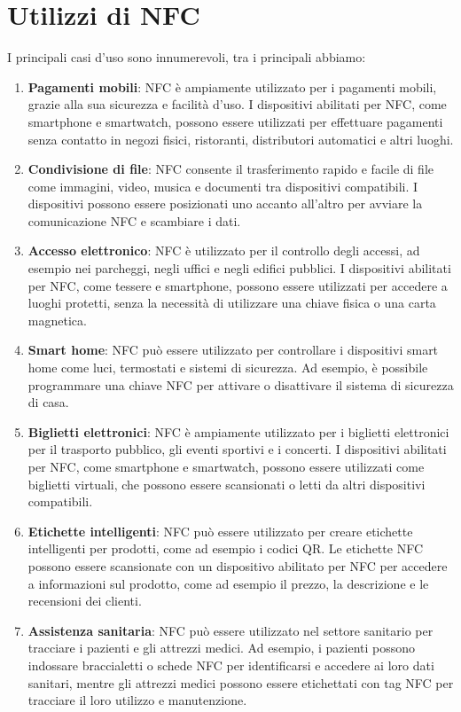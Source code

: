 \documentclass[a4paper,11pt]{report}
\begin{document}
\chapter{Utilizzi di NFC}
I principali casi d'uso sono innumerevoli, tra i principali abbiamo:
\begin{enumerate}
    \item \textbf{Pagamenti mobili}: NFC è ampiamente utilizzato per i pagamenti mobili, grazie alla sua sicurezza e facilità d'uso. I dispositivi abilitati per NFC, come smartphone e smartwatch, possono essere utilizzati per effettuare pagamenti senza contatto in negozi fisici, ristoranti, distributori automatici e altri luoghi.
    \item \textbf{Condivisione di file}: NFC consente il trasferimento rapido e facile di file come immagini, video, musica e documenti tra dispositivi compatibili. I dispositivi possono essere posizionati uno accanto all'altro per avviare la comunicazione NFC e scambiare i dati.
    \item \textbf{Accesso elettronico}: NFC è utilizzato per il controllo degli accessi, ad esempio nei parcheggi, negli uffici e negli edifici pubblici. I dispositivi abilitati per NFC, come tessere e smartphone, possono essere utilizzati per accedere a luoghi protetti, senza la necessità di utilizzare una chiave fisica o una carta magnetica.
    \item \textbf{Smart home}: NFC può essere utilizzato per controllare i dispositivi smart home come luci, termostati e sistemi di sicurezza. Ad esempio, è possibile programmare una chiave NFC per attivare o disattivare il sistema di sicurezza di casa.
    \item \textbf{Biglietti elettronici}: NFC è ampiamente utilizzato per i biglietti elettronici per il trasporto pubblico, gli eventi sportivi e i concerti. I dispositivi abilitati per NFC, come smartphone e smartwatch, possono essere utilizzati come biglietti virtuali, che possono essere scansionati o letti da altri dispositivi compatibili.
    \item \textbf{Etichette intelligenti}: NFC può essere utilizzato per creare etichette intelligenti per prodotti, come ad esempio i codici QR. Le etichette NFC possono essere scansionate con un dispositivo abilitato per NFC per accedere a informazioni sul prodotto, come ad esempio il prezzo, la descrizione e le recensioni dei clienti.
    \item \textbf{Assistenza sanitaria}: NFC può essere utilizzato nel settore sanitario per tracciare i pazienti e gli attrezzi medici. Ad esempio, i pazienti possono indossare braccialetti o schede NFC per identificarsi e accedere ai loro dati sanitari, mentre gli attrezzi medici possono essere etichettati con tag NFC per tracciare il loro utilizzo e manutenzione.

\end{enumerate}
\end{document}
